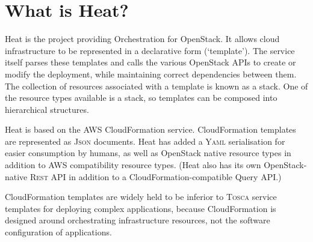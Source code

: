 \section{What is Heat?}

Heat is the project providing Orchestration for OpenStack. It allows cloud infrastructure to be represented in a declarative form (`template'). The service itself parses these templates and calls the various OpenStack APIs to create or modify the deployment, while maintaining correct dependencies between them. The collection of resources associated with a template is known as a stack. One of the resource types available is a stack, so templates can be composed into hierarchical structures.

Heat is based on the AWS CloudFormation service. CloudFormation templates are represented as \textsc{Json} documents. Heat has added a \textsc{Yaml} serialisation for easier consumption by humans, as well as OpenStack native resource types in addition to AWS compatibility resource types. (Heat also has its own OpenStack-native \textsc{Rest} API in addition to a CloudFormation-compatible Query API.)

CloudFormation templates are widely held to be inferior to \textsc{Tosca} service templates for deploying complex applications, because CloudFormation is designed around orchestrating infrastructure resources, not the software configuration of applications.
